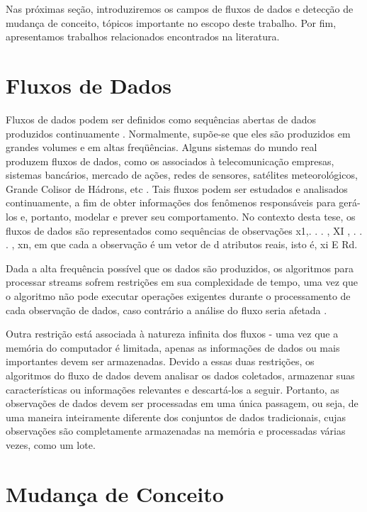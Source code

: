 \documentclass[qual, classic, a4paper]{ufbathesis}
\begin{document}
Nas próximas seção, introduziremos os campos de fluxos de dados e detecção de mudança de conceito, tópicos importante no escopo deste trabalho. Por fim, apresentamos trabalhos relacionados encontrados na literatura.

\section{Fluxos de Dados}

Fluxos de dados podem ser definidos como sequências abertas de dados produzidos continuamente \cite{Pavlidis:2011:9AC:1860144.1860487}.
Normalmente, supõe-se que eles são produzidos em grandes volumes e em altas freqüências. Alguns sistemas do mundo real produzem fluxos de dados, como os associados à telecomunicação empresas, sistemas bancários, mercado de ações, redes de sensores, satélites meteorológicos, Grande Colisor de Hádrons, etc \cite{Guha:2003:CDS:776752.776777}.
Tais fluxos podem ser estudados e analisados continuamente, a fim de obter informações dos fenômenos responsáveis para gerá-los e, portanto, modelar e prever seu comportamento. No contexto desta tese, os fluxos de dados são representados como sequências de observações x1,. . . , XI , . . . , xn, em que cada a observação é um vetor de d atributos reais, isto é, xi E Rd.

Dada a alta frequência possível que os dados são produzidos, os algoritmos para processar streams sofrem restrições em sua complexidade de tempo, uma vez que o algoritmo não pode executar operações exigentes durante o processamento de cada observação de dados, caso contrário a análise do fluxo seria afetada \cite{EDDM}.

Outra restrição está associada à natureza infinita dos fluxos - uma vez que a memória do computador é limitada, apenas as informações de dados ou mais importantes devem ser armazenadas. Devido a essas duas restrições, os algoritmos do fluxo de dados devem analisar os dados coletados, armazenar suas características ou informações relevantes e descartá-los a seguir. Portanto, as observações de dados devem ser processadas em uma única passagem, ou seja, de uma maneira inteiramente diferente dos conjuntos de dados tradicionais, cujas observações são completamente armazenadas na memória e processadas várias vezes, como um lote.

\section{Mudança de Conceito}
\blindtext
\end{document}
